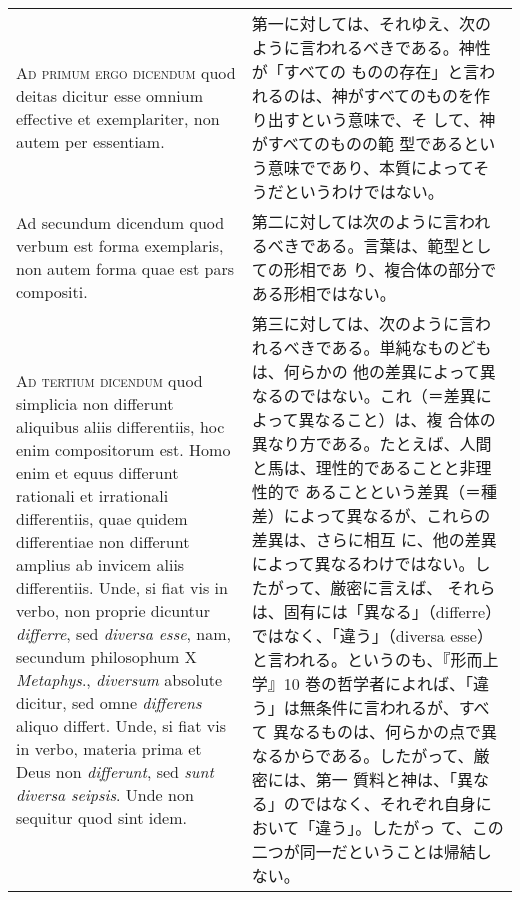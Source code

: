 \documentclass[10pt]{jsarticle} %
\begin{document}
\begin{longtable}{p{21em}p{21em}}
\\

{\scshape Ad primum ergo dicendum} quod deitas dicitur esse omnium
 effective et exemplariter, non autem per essentiam.
&

第一に対しては、それゆえ、次のように言われるべきである。神性が「すべての
 ものの存在」と言われるのは、神がすべてのものを作り出すという意味で、そ
 して、神がすべてのものの範
 型であるという意味でであり、本質によってそうだというわけではない。

\\

Ad secundum dicendum{\scshape } quod verbum est forma exemplaris, non
 autem forma quae est pars compositi.
&

第二に対しては次のように言われるべきである。言葉は、範型としての形相であ
 り、複合体の部分である形相ではない。

\\

{\scshape Ad tertium dicendum} quod simplicia non differunt aliquibus
 aliis differentiis, hoc enim compositorum est. Homo enim et equus
 differunt rationali et irrationali differentiis, quae quidem
 differentiae non differunt amplius ab invicem aliis differentiis. Unde,
 si fiat vis in verbo, non proprie dicuntur {\itshape differre}, sed {\itshape diversa esse},
 nam, secundum philosophum X {\itshape Metaphys}., {\itshape diversum} absolute dicitur, sed
 omne {\itshape differens} aliquo differt. Unde, si fiat vis in verbo, materia
 prima et Deus non {\itshape differunt}, sed {\itshape sunt diversa seipsis}. Unde non
 sequitur quod sint idem.
&

第三に対しては、次のように言われるべきである。単純なものどもは、何らかの
 他の差異によって異なるのではない。これ（＝差異によって異なること）は、複
 合体の異なり方である。たとえば、人間と馬は、理性的であることと非理性的で
 あることという差異（＝種差）によって異なるが、これらの差異は、さらに相互
 に、他の差異によって異なるわけではない。したがって、厳密に言えば、
それらは、固有には「異なる」（differre）ではなく、「違う」（diversa esse）と言われる。というのも、『形而上学』10 巻の哲学者によれば、「違う」は無条件に言われるが、すべて
 異なるものは、何らかの点で異なるからである。したがって、厳密には、第一
 質料と神は、「異なる」のではなく、それぞれ自身において「違う」。したがっ
 て、この二つが同一だということは帰結しない。


\end{longtable}
\end{document}
